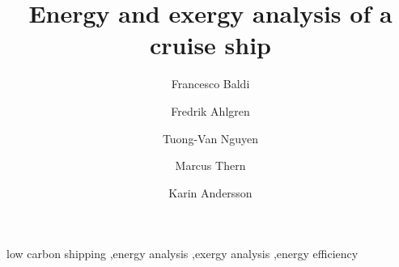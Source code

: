 \documentclass[preprint,12pt]{elsarticle}
\begin{document}
\begin{frontmatter}



\title{Energy and exergy analysis of a cruise ship}


\author[EPFL]{Francesco Baldi}
\author[Linnaeus]{Fredrik Ahlgren}
\author[DTU]{Tuong-Van Nguyen}
\author[LTU]{Marcus Thern}
\author[CTU]{Karin Andersson}

\address[EPFL]{Industrial Process Energy Systems Engineering (IPESE), \'{E}cole Polytechnique F\'{e}d\'{e}rale de Lausanne, 1950, Sion, Switzerland}
\address[Linnaeus]{Kalmar Maritime Academy, Linnaeus University, Kalmar, Sweden}
\address[DTU]{Department of Mechanical Engineering, Technical University of Denmark, Lyngby, Denmark}
\address[LTU]{Energy Sciences, Lund University, Lund SE-22100, Sweden}
\address[CTU]{Department of Mechanics and Maritime Sciences, Chalmers University of technology, Gothenburg, Sweden}


\begin{abstract}

\end{abstract}

\begin{keyword}



low carbon shipping \sep energy analysis \sep exergy analysis \sep energy efficiency

\end{keyword}

\end{frontmatter}
\end{document}
